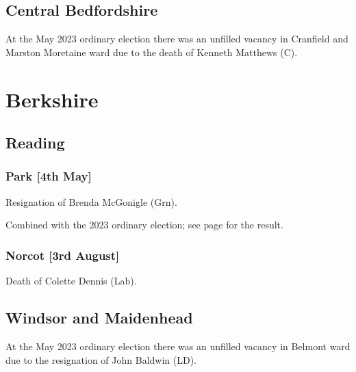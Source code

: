 \documentclass[a4paper,openany]{book}
\begin{document}
\begin{resultsiii}
\subsection*{Central Bedfordshire}

At the May 2023 ordinary election there was an unfilled vacancy in Cranfield and Marston Moretaine ward due to the death of Kenneth Matthews (C).%

\section{Berkshire}

\subsection*{Reading}

\subsubsection*{Park \hspace*{\fill}\nolinebreak[1]%
	\enspace\hspace*{\fill}
	[4th May]}


Resignation of Brenda McGonigle (Grn).

Combined with the 2023 ordinary election; see page \pageref{ReadingPark} for the result.

\subsubsection*{Norcot \hspace*{\fill}\nolinebreak[1]%
	\enspace\hspace*{\fill}
	[3rd August]}


Death of Colette Dennis (Lab).

\subsection*{Windsor and Maidenhead}

At the May 2023 ordinary election there was an unfilled vacancy in Belmont ward due to the resignation of John Baldwin (LD).%


\end{resultsiii}
\end{document}
